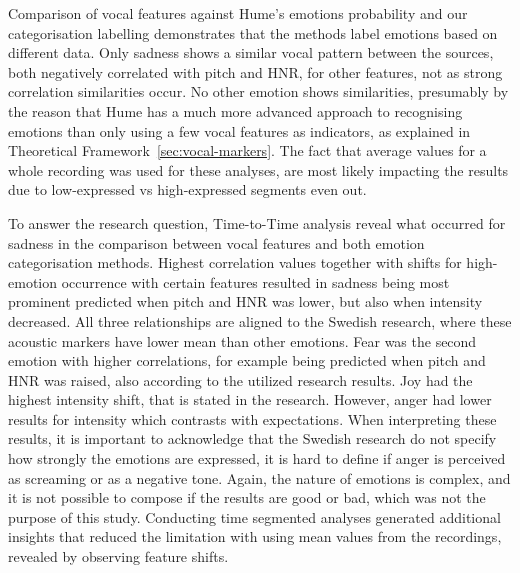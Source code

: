 Comparison of vocal features against Hume’s emotions probability and our categorisation labelling demonstrates that the methods label emotions based on different data. Only sadness shows a similar vocal pattern between the sources, both negatively correlated with pitch and HNR, for other features, not as strong correlation similarities occur. 
No other emotion shows similarities, presumably by the reason that Hume has a much more advanced approach to recognising emotions than only using a few vocal features as indicators, as explained in Theoretical Framework~\ref{sec:vocal-markers}.  The fact that average values for a whole recording was used for these analyses, are most likely impacting the results due to low-expressed vs high-expressed segments even out.  


To answer the research question, Time-to-Time analysis reveal what occurred for sadness in the comparison between vocal features and both emotion categorisation methods. Highest correlation values together with shifts for high-emotion occurrence with certain features resulted in sadness being most prominent predicted when pitch and HNR was lower, but also when intensity decreased. 
All three relationships are aligned to the Swedish research, where these acoustic markers have lower mean than other emotions. 
Fear was the second emotion with higher correlations, for example being predicted when pitch and HNR was raised, also according to the utilized research results. Joy had the highest intensity shift, that is stated in the research. However, anger had lower results for intensity which contrasts with expectations. 
When interpreting these results, it is important to acknowledge that the Swedish research do not specify how strongly the emotions are expressed, it is hard to define if anger is perceived as screaming or as a negative tone. 
Again, the nature of emotions is complex, and it is not possible to compose if the results are good or bad, which was not the purpose of this study. Conducting time segmented analyses generated additional insights that reduced the limitation with using mean values from the recordings, revealed by observing feature shifts. 


